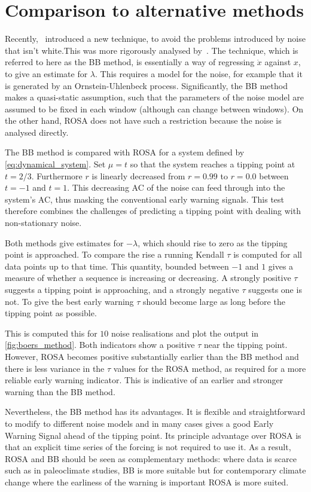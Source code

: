 \section{Comparison to alternative methods}
Recently,~\cite{Boers2021a} introduced a new technique,
to avoid the problems introduced by noise that isn't white.This was
more rigorously analysed by~\cite{Boettner2022}. The
technique, which is referred to here as the BB method, is essentially a way of
regressing $\dot{x}$ against $x$, to give an estimate for $\lambda$. 
This requires a model for the noise, for example that it is
generated by an Ornstein-Uhlenbeck process. Significantly, the BB method makes a quasi-static assumption, such that the parameters of the noise
model are assumed to be fixed in each window (although can change between windows). On the other hand,
ROSA does not have such a restriction because the noise is analysed directly.

The BB method is compared with ROSA for a system defined by
\cref{eq:dynamical_system}. Set $\mu  = t$ so that the system
reaches a tipping point at $t=2/3$. Furthermore $r$ is linearly decreased
from $r=0.99$ to $r=0.0$ between $t=-1$ and $t=1$.
This decreasing AC of the
noise can feed through into the system's AC, thus masking
the conventional early warning signals. This test therefore
combines the challenges of predicting a tipping point with dealing
with non-stationary noise.

Both methods give estimates for $-\lambda$, which should rise
to zero as the tipping point is approached. To compare the 
rise a running Kendall $\tau$ \parencite{Wilks2019} is computed for all data points up to
that time. This quantity, bounded 
between $-1$ and $1$ gives a measure of whether a sequence is 
increasing or decreasing. A strongly positive $\tau$ suggests a tipping point is approaching, and a strongly
negative $\tau$ suggests one is not. To give the best early warning $\tau$ should become
large as long before the tipping point as possible.


This is computed this for $10$ noise realisations and plot the output 
in \cref{fig:boers_method}. Both indicators show a positive 
$\tau$ near the tipping point. However, ROSA becomes positive substantially earlier than the BB method and there is
less variance in the $\tau$ values for the ROSA method, as required for a more reliable early warning indicator.
This is indicative of an earlier and stronger warning than the BB method. 

Nevertheless, the BB method has its advantages.
It is flexible and straightforward to modify to different noise
models and in many cases gives a good Early Warning Signal 
ahead of the tipping point. Its principle advantage
over ROSA is that an explicit time series of the forcing is not required to use it. As a result, ROSA and BB should be seen as complementary methods: 
where data is scarce such as in paleoclimate studies, BB is more suitable but 
for contemporary climate change where the earliness of the warning is 
important ROSA is more suited.

